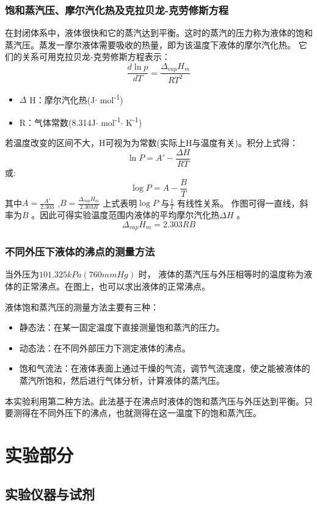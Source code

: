 \documentclass[11pt]{report}
\begin{document}
\section{饱和蒸汽压、摩尔汽化热及克拉贝龙-克劳修斯方程}
\label{sec:org5433076}
在封闭体系中，液体很快和它的蒸汽达到平衡。这时的蒸汽的压力称为液体的饱和蒸汽压。蒸发一摩尔液体需要吸收的热量，即为该温度下液体的摩尔汽化热。
它们的关系可用克拉贝龙-克劳修斯方程表示：
\[
    \frac{d \ln p}{d T}=\frac{\Delta_{vap}H_{m}}{RT^{2}}
    \]
\begin{itemize}
\item \(\Delta\) H：摩尔汽化热(J\(\cdot\) mol\textsuperscript{-1})
\item R：气体常数(8.314J\(\cdot\) mol\textsuperscript{-1}\(\cdot\) K\textsuperscript{-1})
\end{itemize}
若温度改变的区间不大，H可视为为常数(实际上H与温度有关)。积分上式得：
\[
    \ln P = A'-\frac{\Delta H}{RT}
    \]
或:
\[
    \log P = A-\frac{B}{T}
    \]
其中\(A=\frac{A'}{2.303}\) ,\(B=\frac{\Delta_{vap}H_{m}}{2.303R}\) 上式表明\(\log P\) 与\(\frac{1}{T}\) 有线性关系。
作图可得一直线，斜率为\(B\) 。因此可得实验温度范围内液体的平均摩尔汽化热\(\Delta H\) 。
\[
    \Delta_{vap}H_{m}=2.303 R B
    \]
\section{不同外压下液体的沸点的测量方法}
\label{sec:org08b5f4c}
当外压为\(101.325kPa(760mmHg)\) 时，
液体的蒸汽压与外压相等时的温度称为液体的正常沸点。在图上，也可以求出液体的正常沸点。

液体饱和蒸汽压的测量方法主要有三种：
\begin{itemize}
\item 静态法：在某一固定温度下直接测量饱和蒸汽的压力。
\item 动态法：在不同外部压力下测定液体的沸点。
\item 饱和气流法：在液体表面上通过干燥的气流，调节气流速度，使之能被液体的蒸汽所饱和，然后进行气体分析，计算液体的蒸汽压。
\end{itemize}

本实验利用第二种方法。此法基于在沸点时液体的饱和蒸汽压与外压达到平衡。只要测得在不同外压下的沸点，也就测得在这一温度下的饱和蒸汽压。

\part{实验部分}
\label{sec:org2c506ac}
\chapter{实验仪器与试剂}
\label{sec:org0d63eb9}
\end{document}
